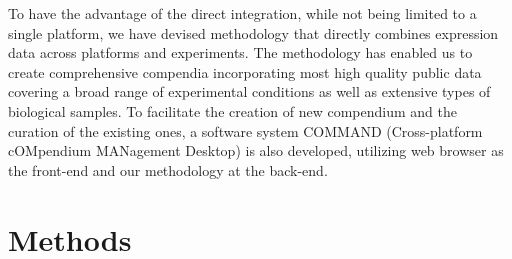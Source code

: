To have the advantage of the direct integration, while not being limited to a
single platform, we have devised methodology that directly combines expression
data across platforms and experiments.
%
The methodology has enabled us to create comprehensive compendia incorporating
most high quality public data covering a broad range of experimental conditions
as well as extensive types of biological samples.
%
To facilitate the creation of new compendium and the curation of the existing
ones, a software system COMMAND (Cross-platform cOMpendium MANagement Desktop)
is also developed, utilizing web browser as the front-end and our methodology
at the back-end.




\section{Methods}









